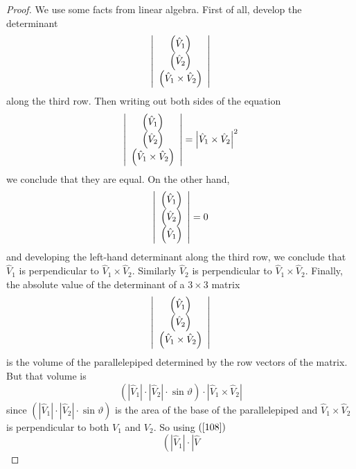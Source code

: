 \documentclass{ximera}
\begin{document}
\begin{proof}
We use some facts from linear algebra. First of all, develop the determinant%
\[
\left\vert
\begin{array}
[c]{c}%
\left(  \hat{V}_{1}\right) \\
\left(  \hat{V}_{2}\right) \\
\left(  \hat{V}_{1}\times\hat{V}_{2}\right)
\end{array}
\right\vert
\]
along the third row. Then writing out both sides of the equation%
\begin{equation}
\left\vert
\begin{array}
[c]{c}%
\left(  \hat{V}_{1}\right) \\
\left(  \hat{V}_{2}\right) \\
\left(  \hat{V}_{1}\times\hat{V}_{2}\right)
\end{array}
\right\vert =\left\vert \hat{V}_{1}\times\hat{V}_{2}\right\vert ^{2}
\label{108}%
\end{equation}
we conclude that they are equal. On the other hand,
\[
\left\vert
\begin{array}
[c]{c}%
\left(  \hat{V}_{1}\right) \\
\left(  \hat{V}_{2}\right) \\
\left(  \hat{V}_{1}\right)
\end{array}
\right\vert =0
\]
and developing the left-hand determinant along the third row, we conclude that
$\hat{V}_{1}$ is perpendicular to $\hat{V}_{1}\times\hat{V}_{2}$. Similarly
$\hat{V}_{2}$ is perpendicular to $\hat{V}_{1}\times\hat{V}_{2}$. Finally, the
absolute value of the determinant of a $3\times3$ matrix%
\[
\left\vert
\begin{array}
[c]{c}%
\left(  \hat{V}_{1}\right) \\
\left(  \hat{V}_{2}\right) \\
\left(  \hat{V}_{1}\times\hat{V}_{2}\right)
\end{array}
\right\vert
\]
is the volume of the parallelepiped determined by the row vectors of the
matrix. But that volume is%
\[
\left(  \left\vert \hat{V}_{1}\right\vert \cdot\left\vert \hat{V}%
_{2}\right\vert \cdot\sin\vartheta\right)  \cdot\left\vert \hat{V}%
_{1}\times\hat{V}_{2}\right\vert
\]
since $\left(  \left\vert \hat{V}_{1}\right\vert \cdot\left\vert \hat{V}%
_{2}\right\vert \cdot\sin\vartheta\right)  $ is the area of the base
of the parallelepiped and $\hat{V}_{1}\times\hat{V}_{2}$ is perpendicular to
both $V_{1}$ and $V_{2}$. So using $\left(  \ref{108}\right)  $%
\[
\left(  \left\vert \hat{V}_{1}\right\vert \cdot\left\vert \hat{V}%
\]
\end{proof}
\end{document}
